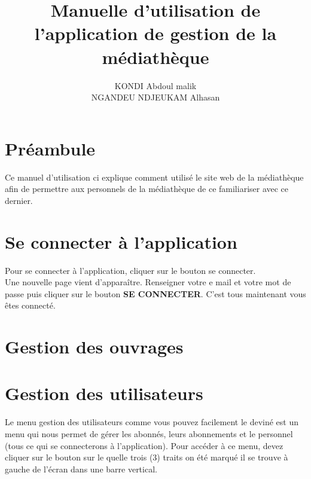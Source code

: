 \documentclass[12pt,a4paper]{article}
\author{KONDI Abdoul malik \\ NGANDEU NDJEUKAM Alhasan}
\title{Manuelle d'utilisation de l'application de gestion de la médiathèque}
\begin{document}
\maketitle
\tableofcontents
\newpage

\section{Préambule}
Ce manuel d'utilisation ci explique comment utilisé le site web de la médiathèque afin
de permettre aux personnels de la médiathèque de ce familiariser avec ce dernier.

\newpage
\section{Se connecter à l'application}
Pour se connecter à l'application, cliquer sur le bouton se connecter.\\
Une nouvelle page vient d'apparaître. Renseigner votre e mail et votre mot de passe 
puis cliquer sur le bouton \textbf{SE CONNECTER}. C'est tous maintenant vous êtes 
connecté.

\newpage
\section{Gestion des ouvrages}



































\newpage
\section{Gestion des utilisateurs}
Le menu gestion des utilisateurs comme vous pouvez facilement le deviné est un menu qui
nous permet de gérer les abonnés, leurs abonnements et le personnel (tous ce qui se
connecterons à l'application). Pour accéder à ce menu, devez cliquer sur le bouton sur le
quelle trois (3) traits on été marqué il se trouve à gauche de l'écran dans une barre
vertical. \\
\end{document}

